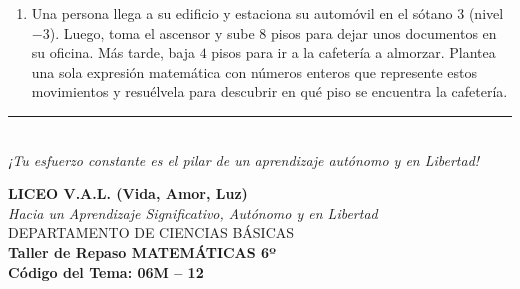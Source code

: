 \documentclass[12pt, letterpaper]{article}
\begin{document}
\begin{enumerate}[itemsep=0.8cm]
		A partir de la información de la tabla, responde:
		\begin{enumerate}[label=\alph*., itemsep=0.2cm, topsep=0.2cm]
			\item ¿Cuántos grados exactamente subió o bajó la temperatura entre las 6:00 a.m. y el mediodía? Plantea la operación matemática.
			\item Si a la medianoche la temperatura descendió $3^{\circ}\text{C}$ más en comparación con el registro de las 8:00 p.m., ¿cuál fue la temperatura exacta a la medianoche?
		\end{enumerate}
		
		\item Una persona llega a su edificio y estaciona su automóvil en el sótano 3 (nivel $-3$). Luego, toma el ascensor y sube $8$ pisos para dejar unos documentos en su oficina. Más tarde, baja $4$ pisos para ir a la cafetería a almorzar. Plantea una sola expresión matemática con números enteros que represente estos movimientos y resuélvela para descubrir en qué piso se encuentra la cafetería.
		
	\end{enumerate}
	
	\vfill
	\begin{center}
		\rule{0.5\textwidth}{0.4pt} \\
		\vspace{0.2cm}
		\textit{¡Tu esfuerzo constante es el pilar de un aprendizaje autónomo y en Libertad!}
	\end{center}
	
	\newpage
	\begin{center}
		{\Large \textbf{LICEO V.A.L. (Vida, Amor, Luz)}}\\[0.1cm]
		{\normalsize \textit{Hacia un Aprendizaje Significativo, Autónomo y en Libertad}}\\[0.2cm]
		{\large DEPARTAMENTO DE CIENCIAS BÁSICAS}\\[0.1cm]
		\textbf{Taller de Repaso MATEMÁTICAS 6º}\\[0.1cm]
		\textbf{Código del Tema: 06M – 12}\\[0.1cm]
	\end{center}
	
\end{document}
